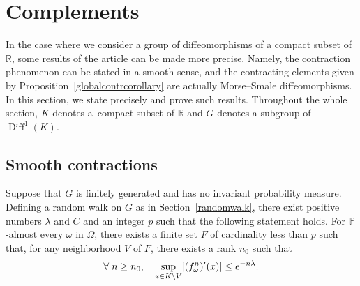 \documentclass[10pt]{amsart}
\theoremstyle{definition}\newtheorem{defi}[theo]{Definition}\newtheorem{rema}[theo]{Remark}\newtheorem{exam}[theo]{Example}\newtheorem{exem}[theo]{Example}\newtheorem{nota}[theo]{Notation}
\DeclareMathOperator{\Diff}{Diff}
\newcommand{\bbP}{\mathbb{P}}
\newcommand{\R}{\mathbb{R}}
\newcounter{setofcase}
\newcounter{case}[setofcase]
\let\originalleft\left
\let\originalright\right
\renewcommand{\left}{\mathopen{}\mathclose\bgroup\originalleft}
\renewcommand{\right}{\aftergroup\egroup\originalright}
\let\oldforall\forall
\renewcommand*{\forall}{\mathrel{\oldforall}}
\begin{document}
\section{Complements}

In the case where we consider a group of diffeomorphisms of a compact subset of~$\R$, some results of the article can be made more precise. Namely, the contraction phenomenon can be stated in a smooth sense, and the contracting elements given by Proposition~\ref{globalcontrcorollary} are actually Morse--Smale diffeomorphisms. In this section, we state precisely and prove such results. Throughout the whole section, $K$ denotes a~compact subset of $\R$ and $G$ denotes a subgroup of $\Diff^1(K)$.


\subsection{Smooth contractions}

\begin{prop}\label{globalcontrdiffeo}
Suppose that $G$ is finitely generated and has no invariant probability measure. Defining a random walk on $G$ as in Section~\ref{randomwalk}, there exist positive numbers $\lambda$ and $C$ and an integer $p$ such that the following statement holds. For $\bbP$-almost every $\omega$ in $\Omega$, there exists a finite set $F$ of cardinality less than $p$ such that, for any neighborhood $V$ of $F$, there exists a rank $n_0$ such that
\[
\forall n\geq n_0,\quad \sup_{x\in K\backslash V} \left|(f_\omega^n)'(x)\right|\leq e^{-n\lambda}.
\]
\end{prop}
\end{document}
